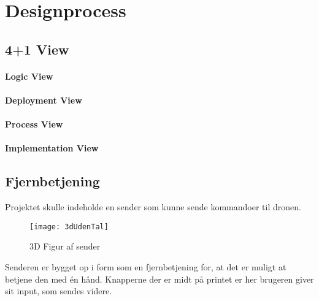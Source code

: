 \documentclass[Main]{subfiles}
\begin{document}
\section{Designprocess}

\subsection{4+1 View}


\paragraph{Logic View}


\paragraph{Deployment View}


\paragraph{Process View}


\paragraph{Implementation View}



\subsection{Fjernbetjening}

Projektet skulle indeholde en sender som kunne sende kommandoer til dronen.

\begin{figure}[H]
\centering
\texttt{[image: 3dUdenTal]}
\caption{3D Figur af sender}
\label{Fig:3dUdenTal}
\end{figure}


Senderen er bygget op i form som en fjernbetjening for, at det er muligt at betjene den med én hånd.
Knapperne der er midt på printet er her brugeren giver sit input, som sendes videre.
\end{document}
